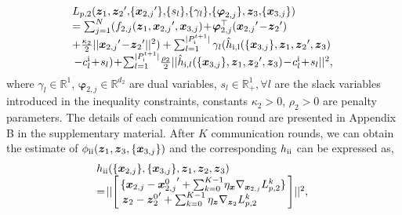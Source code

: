 \documentclass[letterpaper]{article} %
\begin{document}
\begin{equation}
\begin{array}{l}
  \!   L_{p,2}({\boldsymbol{z}_1},{\boldsymbol{z}_2}', \! \{{\boldsymbol{x}_{2,j}}'\},\! \{ s_l\},\! \{\gamma_l\},\! \{\boldsymbol{\varphi}_{2,j}\}, {\boldsymbol{z}_3},\! \{{\boldsymbol{x}_{3,j}}\}) \\%

\!  =  \sum\nolimits_{j=1}^N  ({{f_{2,j}}({\boldsymbol{z}_1},{\boldsymbol{x}_{2,j}}',{\boldsymbol{x}_{3,j}})} \!+\! {\boldsymbol{\varphi}_{2,j}^{\top}}({\boldsymbol{x}_{2,j}}'\! -\! {\boldsymbol{z}_2}')  \\
\! + \frac{\kappa_2}{2}||{\boldsymbol{x}_{2,j}}'\!-\! {\boldsymbol{z}_2}'||^2 )

+\sum\nolimits_{l = 1}^{|P_{\rm{\uppercase\expandafter{\romannumeral1}}}^{t + 1}|} \gamma_l ( \hat{h}_{\rm{\uppercase\expandafter{\romannumeral1}},l}(\{{\boldsymbol{x}_{3,j}}\},\boldsymbol{z}_1, {\boldsymbol{z}_2}',\boldsymbol{z}_3 )
\\
- c_l^{\rm{\uppercase\expandafter{\romannumeral1}}} \!+\!s_l )
   \! + \! \sum\nolimits_{l = 1}^{|P_{\rm{\uppercase\expandafter{\romannumeral1}}}^{t + 1}|} \! \frac{\rho_2}{2} || \hat{h}_{{\rm{\uppercase\expandafter{\romannumeral1}}},l}(\{{\boldsymbol{x}_{3,j}}\},\boldsymbol{z}_1, {\boldsymbol{z}_2}',\boldsymbol{z}_3 ) \! - \! c_l^{\rm{\uppercase\expandafter{\romannumeral1}}} \! + \! s_l||^2,
\end{array}
\end{equation}
where $\gamma_l \!\in\! \mathbb{R}^1$, ${\boldsymbol{\varphi}_{2,j}}\!\in\! \mathbb{R}^{d_2}$ are dual variables, $s_l\!\in\!\mathbb{R}^1_{+},\forall l$ are the slack variables introduced in the inequality constraints, constants $\kappa_2\!>\!0$, $\rho_2\!>\!0$ are penalty parameters. The details of each communication round are presented in Appendix B in the supplementary material.  After $K$ communication rounds, we can obtain the estimate of $\phi_{{\rm{\uppercase\expandafter{\romannumeral2}}}}({\boldsymbol{z}_1}, {\boldsymbol{z}_3}, \{{\boldsymbol{x}_{3,j}}\})$ and the corresponding $h_{{\rm{\uppercase\expandafter{\romannumeral2}}}}$ can be expressed as,
\begin{equation}
\label{eq:4_23_18}
\begin{array}{l}
 \!    h_{{\rm{\uppercase\expandafter{\romannumeral2}}}}(\{{\boldsymbol{x}_{2,j}}\} ,\{ {\boldsymbol{x}_{3,j}}\} ,{\boldsymbol{z}_1}, {\boldsymbol{z}_2},{\boldsymbol{z}_3}) \\

     \!=\! ||\! \left[\! \begin{array}{l}
 \! \{ \boldsymbol{x}_{2,j} - {\boldsymbol{x}_{2,j}^{0}}'+\sum\nolimits_{k = 0}^{K-1} \! \eta_{\boldsymbol{x}}  \nabla_{\boldsymbol{x}_{2,j}}  L_{p,2}^k \} \! \\%

  \boldsymbol{z}_2 - {\boldsymbol{z}_2^{0}}'+\sum\nolimits_{k = 0}^{K-1} \eta_{\boldsymbol{z}} \nabla_{\boldsymbol{z}_2}  L_{p,2}^k
\end{array} \! \right]\!  ||^2 ,
\end{array}
\end{equation}
\end{document}
